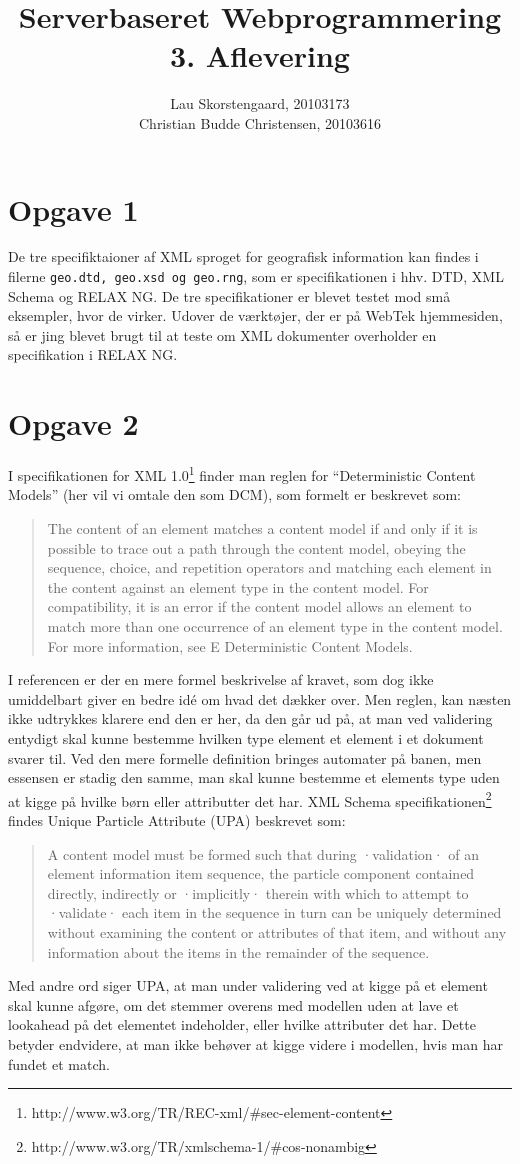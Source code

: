 \documentclass[a4paper,10pt]{article}
\author{Lau Skorstengaard, 20103173 \\Christian Budde Christensen, 20103616}
\title{Serverbaseret Webprogrammering\\3. Aflevering}
\begin{document}
\maketitle
\section*{Opgave 1}
De tre specifiktaioner af XML sproget for geografisk information kan findes i filerne \texttt{geo.dtd, geo.xsd og geo.rng}, som er specifikationen i hhv. DTD, XML Schema og RELAX NG. De tre specifikationer er blevet testet mod små eksempler, hvor de virker. Udover de værktøjer, der er på WebTek hjemmesiden, så er jing blevet brugt til at teste om XML dokumenter overholder en specifikation i RELAX NG.

\section*{Opgave 2}
I specifikationen for XML 1.0\footnote{http://www.w3.org/TR/REC-xml/\#sec-element-content} finder man reglen for ``Deterministic Content Models'' (her vil vi omtale den som DCM), som formelt er beskrevet som:
\begin{quotation}
The content of an element matches a content model if and only if it is possible to trace out a path through the content model, obeying the sequence, choice, and repetition operators and matching each element in the content against an element type in the content model. For compatibility, it is an error if the content model allows an element to match more than one occurrence of an element type in the content model. For more information, see E Deterministic Content Models.
\end{quotation}
I referencen er der en mere formel beskrivelse af kravet, som dog ikke umiddelbart giver en bedre idé om hvad det dækker over. Men reglen, kan næsten ikke udtrykkes klarere end den er her, da den går ud på, at man ved validering entydigt skal kunne bestemme hvilken type element et element i et dokument svarer til. Ved den mere formelle definition bringes automater på banen, men essensen er stadig den samme, man skal kunne bestemme et elements type uden at kigge på hvilke børn eller attributter det har.  XML Schema specifikationen\footnote{http://www.w3.org/TR/xmlschema-1/\#cos-nonambig} findes Unique Particle Attribute (UPA) beskrevet som:
\begin{quotation}
A content model must be formed such that during ·validation· of an element information item sequence, the particle component contained directly, indirectly or ·implicitly· therein with which to attempt to ·validate· each item in the sequence in turn can be uniquely determined without examining the content or attributes of that item, and without any information about the items in the remainder of the sequence.
\end{quotation}
Med andre ord siger UPA, at man under validering ved at kigge på et element skal kunne afgøre, om det stemmer overens med modellen uden at lave et lookahead på det elementet indeholder, eller hvilke attributer det har. Dette betyder endvidere, at man ikke behøver at kigge videre i modellen, hvis man har fundet et match.
\end{document}
